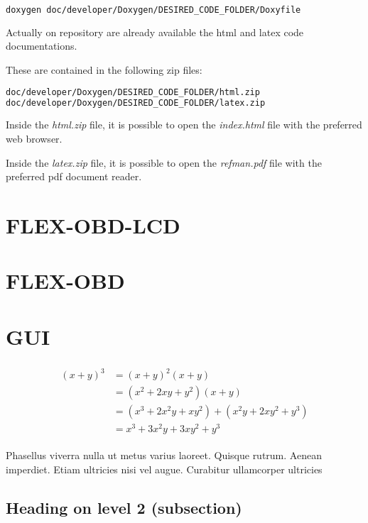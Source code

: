 \documentclass[paper=a4, fontsize=11pt]{scrartcl} %
\numberwithin{equation}{section} %
\numberwithin{figure}{section} %
\numberwithin{table}{section} %
\begin{document}
\begin{lstlisting}[language=bash]
doxygen doc/developer/Doxygen/DESIRED_CODE_FOLDER/Doxyfile
\end{lstlisting}

Actually on repository are already available the html and latex code documentations.

These are contained in the following zip files:

\begin{lstlisting}[language=bash]
doc/developer/Doxygen/DESIRED_CODE_FOLDER/html.zip
doc/developer/Doxygen/DESIRED_CODE_FOLDER/latex.zip
\end{lstlisting}

Inside the \emph{html.zip} file, it is possible to open the \emph{index.html} file with the preferred web browser.

Inside the \emph{latex.zip} file, it is possible to open the \emph{refman.pdf} file with the preferred pdf document reader.

\section{FLEX-OBD-LCD}
\section{FLEX-OBD}
\section{GUI}


\begin{align} 
\begin{split}
(x+y)^3 	&= (x+y)^2(x+y)\\
&=(x^2+2xy+y^2)(x+y)\\
&=(x^3+2x^2y+xy^2) + (x^2y+2xy^2+y^3)\\
&=x^3+3x^2y+3xy^2+y^3
\end{split}					
\end{align}

Phasellus viverra nulla ut metus varius laoreet. Quisque rutrum. Aenean imperdiet. Etiam ultricies nisi vel augue. Curabitur ullamcorper ultricies


\subsection{Heading on level 2 (subsection)}
\end{document}
